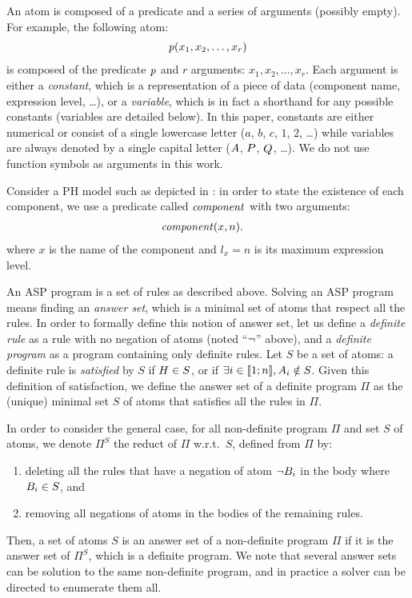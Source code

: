 An atom is composed of a predicate and a series of arguments (possibly empty).
For example, the following atom:
\begin{align*}
  \mathit{p}(x_1, x_2, \dots, x_r)
\end{align*}
is composed of the predicate $\mathit{p}$ and $r$ arguments: $x_1, x_2, \dots, x_r$.
Each argument is either a \emph{constant}, which is a representation of a piece of data (component name, expression level, …),
or a \emph{variable}, which is in fact a shorthand for any possible constants (variables are detailed below).
In this paper, constants are either numerical or consist of a single lowercase letter (\eg $a$, $b$, $c$, $1$, $2$, …)
while variables are always denoted by a single capital letter (\eg $A$, $P$, $Q$, …).
We do not use function symbols as arguments in this work.

\begin{example}\label{ex:asp-atom}
Consider a PH model such as depicted in :
in order to state the existence of each component, we use a predicate called $\mathit{component}$ with two arguments:
\begin{align*}
  &\mathit{component}(x, n).
\end{align*}
where $x$ is the name of the component and $l_x = n$ is its maximum expression level.
\end{example}

An ASP program is a set of rules as described above.
Solving an ASP program means finding an \emph{answer set}, which is a minimal set of atoms that respect all the rules.
In order to formally define this notion of answer set,
let us define a \emph{definite rule} as a rule with no negation of atoms (noted “$\neg$” above),
and a \emph{definite program} as a program containing only definite rules.
Let $S$ be a set of atoms: a definite rule is \emph{satisfied} by $S$ if $H \in S$,
or if $\exists i \in \llbracket 1 ; n \rrbracket, A_i \notin S$.
Given this definition of satisfaction, we define the answer set of a definite program $\Pi$
as the (unique) minimal set $S$ of atoms that satisfies all the rules in $\Pi$.

In order to consider the general case,
for all non-definite program $\Pi$ and set $S$ of atoms, we denote $\Pi^S$ the reduct of $\Pi$ w.r.t.~$S$, defined from $\Pi$ by:
\begin{enumerate}
  \item deleting all the rules that have a negation of atom $\neg B_i$ in the body where $B_i \in S$, and
  \item removing all negations of atoms in the bodies of the remaining rules.
\end{enumerate}
Then, a set of atoms $S$ is an answer set of a non-definite program $\Pi$ if it is the answer set of $\Pi^S$, which is a definite program.
We note that several answer sets can be solution to the same non-definite program, and in practice a solver can be directed to enumerate them all.

